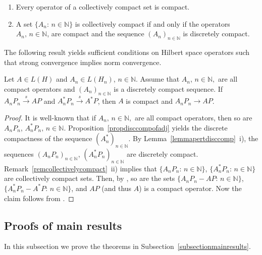 \documentclass[a4paper,reqno]{amsart}
\begin{document}
{\begin{rem}\label{remcollectivelycompact}
  \begin{enumerate}[label=\rm{\roman{*})}]
   \item Every operator of a collectively compact set is compact.
   \item A set $\{A_n:\,n\in{\mathbb{N}}\}$ is collectively compact if and only if the operators $A_n,\,n\in{\mathbb{N}}$, are compact and the sequence $(A_n)_{n\in{\mathbb{N}}}$ is discretely compact. 
 \end{enumerate}
 \end{rem}

The following result 
yields sufficient conditions on Hilbert space operators such that strong convergence implies norm convergence.

\begin{prop}\label{corgsrimpliesgnr}
 Let 
$A\in L(H)$ and $A_n\in L(H_n)$, $n\in{\mathbb{N}}$. 
Assume that $A_n$, $n\in{\mathbb{N}},$ are all compact operators and $(A_n)_{n\in{\mathbb{N}}}$ is a discretely compact sequence.
If $A_nP_n{\stackrel{s}{\rightarrow}} AP$ and $A_n^*P_n{\stackrel{s}{\rightarrow}} A^*P$, then $A$ is compact and $A_nP_n\to AP$.
\end{prop}
\begin{proof}
 It is well-known that if $A_n,\,n\in{\mathbb{N}},$ are all compact operators, then so are $A_nP_n$, $A_n^*P_n,\,n\in{\mathbb{N}}$.
Proposition~\ref{propdisccompofadj} yields the discrete compactness of the sequence $(A_n^*)_{n\in{\mathbb{N}}}$.
By Lemma~\ref{lemmapertdisccomp}~i), the sequences  $(A_nP_n)_{n\in{\mathbb{N}}}$,  $(A_n^*P_n)_{n\in{\mathbb{N}}}$ are discretely compact.
Remark~\ref{remcollectivelycompact}~ii) implies that $\{A_nP_n:\,n\in{\mathbb{N}}\}$, $\{A_n^*P_n:\,n\in{\mathbb{N}}\}$ are collectively compact sets.
Then, by \cite[Proposition 2.1 (a)$\,\, {\Longrightarrow}\,~$(b)]{anselonepalmer}, so are the sets $\{A_nP_n-AP:\,n\in{\mathbb{N}}\}$, $\{A_n^*P_n-A^*P:\,n\in{\mathbb{N}}\}$, and $AP$ (and thus $A$) is a compact operator.
Now the claim follows from \cite[Theorem 3.4~(c)]{anselonepalmer}.
\end{proof}

\subsection{Proofs of main results}\label{subsectionproofs}
In this subsection we prove the theorems in Subsection~\ref{subsectionmainresults}.

}
\end{document}
